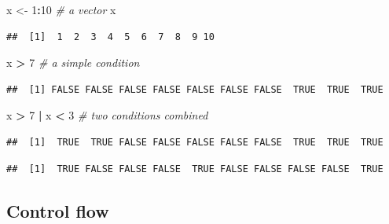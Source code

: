 \documentclass[]{book}
\newenvironment{Shaded}{\begin{snugshade}}{\end{snugshade}}
\newcommand{\CommentTok}[1]{\textcolor[rgb]{0.56,0.35,0.01}{\textit{#1}}}
\newcommand{\DecValTok}[1]{\textcolor[rgb]{0.00,0.00,0.81}{#1}}
\newcommand{\KeywordTok}[1]{\textcolor[rgb]{0.13,0.29,0.53}{\textbf{#1}}}
\newcommand{\NormalTok}[1]{#1}
\newcommand{\OperatorTok}[1]{\textcolor[rgb]{0.81,0.36,0.00}{\textbf{#1}}}
\newcommand{\StringTok}[1]{\textcolor[rgb]{0.31,0.60,0.02}{#1}}
\begin{document}
\begin{Shaded}
\begin{Highlighting}[]
\NormalTok{x <-}\StringTok{ }\DecValTok{1}\OperatorTok{:}\DecValTok{10} \CommentTok{# a vector}
\NormalTok{x}
\end{Highlighting}
\end{Shaded}

\begin{verbatim}
##  [1]  1  2  3  4  5  6  7  8  9 10
\end{verbatim}

\begin{Shaded}
\begin{Highlighting}[]
\NormalTok{x }\OperatorTok{>}\StringTok{ }\DecValTok{7} \CommentTok{# a simple condition}
\end{Highlighting}
\end{Shaded}

\begin{verbatim}
##  [1] FALSE FALSE FALSE FALSE FALSE FALSE FALSE  TRUE  TRUE  TRUE
\end{verbatim}

\begin{Shaded}
\begin{Highlighting}[]
\NormalTok{x }\OperatorTok{>}\StringTok{ }\DecValTok{7} \OperatorTok{|}\StringTok{ }\NormalTok{x }\OperatorTok{<}\StringTok{ }\DecValTok{3} \CommentTok{# two conditions combined}
\end{Highlighting}
\end{Shaded}

\begin{verbatim}
##  [1]  TRUE  TRUE FALSE FALSE FALSE FALSE FALSE  TRUE  TRUE  TRUE
\end{verbatim}

\begin{Shaded}
\end{Shaded}

\begin{verbatim}
##  [1]  TRUE FALSE FALSE FALSE  TRUE FALSE FALSE FALSE FALSE  TRUE
\end{verbatim}

\hypertarget{control-flow}{%
\subsection{Control flow}\label{control-flow}}
\end{document}
